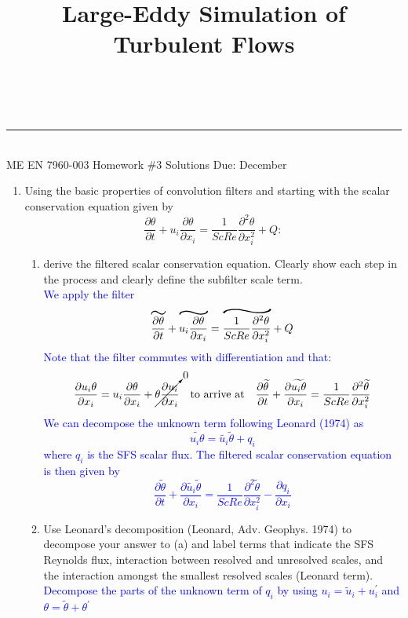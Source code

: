 \documentclass[11pt]{article}
\makeatletter
\newcommand{\linia}{\rule{\linewidth}{0.5pt}}
\renewcommand{\maketitle}{
\begin{center}
\vspace{2ex}
{\huge \textsc{\@title}}
\vspace{1ex}
\\
\linia\\
ME EN 7960-003 \hfill Homework \#3 Solutions \hfill Due: December \nth{1}
\vspace{4ex}
\end{center}
}
\newcommand\reallywidetilde[1]{\ThisStyle{%
  \setbox0=\hbox{$\SavedStyle#1$}%
  \stackengine{-.1\LMpt}{$\SavedStyle#1$}{%
    \stretchto{\scaleto{\SavedStyle\mkern.2mu\sim}{.5467\wd0}}{.4\ht0}%
  }{O}{c}{F}{T}{S}%
}}
\makeatother
\begin{document}
\title{Large-Eddy Simulation of Turbulent Flows}

\maketitle

\begin{enumerate}

\item Using the basic properties of convolution filters and starting with the scalar conservation equation given by
\begin{displaymath}
\frac{\partial \theta}{\partial t} + u_i\frac{\partial \theta}{\partial x_i} = \frac{1}{ScRe}\frac{\partial^2 \theta}{\partial x_i^2}+Q :
\end{displaymath}

\begin{enumerate}
\item derive the filtered scalar conservation equation.  Clearly show each step in the process and clearly define the subfilter scale term.\\
\textcolor{blue}{We apply the filter
$$\reallywidetilde{\frac{\partial \theta}{\partial t}} + \reallywidetilde{u_i\frac{\partial \theta}{\partial x_i}} = \reallywidetilde{\frac{1}{ScRe}\frac{\partial^2 \theta}{\partial x_i^2}}+Q$$
Note that the filter commutes with differentiation and that:
$$\frac{\partial u_i \theta}{\partial x_i} = u_i\frac{\partial \theta}{\partial x_i} + \cancelto{0}{\theta\frac{\partial u_i}{\partial x_i}}\quad  \text{to arrive at}\quad
\frac{\partial \widetilde{\theta}}{\partial t} + \frac{\partial \widetilde{u_i \theta}}{\partial x_i} = \frac{1}{ScRe}\frac{\partial^2 \widetilde{\theta}}{\partial x_i^2}$$
We can decompose the unknown term following Leonard (1974) as
$$\widetilde{u_i \theta} = \widetilde{u_i}\widetilde{\theta} + q_i$$
where $q_i$ is the SFS scalar flux. The filtered scalar conservation equation is then given by
$$\boxed{\frac{\partial \widetilde{\theta}}{\partial t} + \frac{\partial \widetilde{u_i} \widetilde{\theta}}{\partial x_i} = \frac{1}{ScRe}\frac{\partial^2 \widetilde{\theta}}{\partial x_i^2} - \frac{\partial q_i}{\partial x_i}}$$
}
\item Use Leonard's decomposition (Leonard, Adv. Geophys. 1974) to decompose your answer to (a) and label terms that indicate the SFS Reynolds flux, interaction between resolved and unresolved scales, and the interaction amongst the smallest resolved scales (Leonard term).\\
\textcolor{blue}{Decompose the parts of the unknown term of $q_i$ by using $u_i = \widetilde{u}_i + u_i^\prime$ and $\theta = \widetilde{\theta} + \theta^\prime$
}
\end{enumerate}
\end{enumerate}
\end{document}
